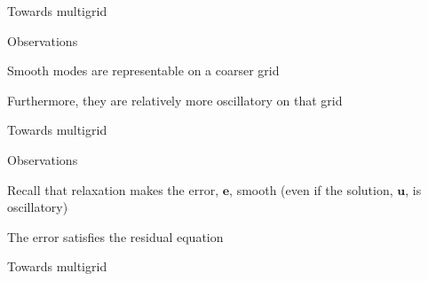 \documentclass[18pt,xcolor=table]{beamer}
\begin{document}
\begin{frame}{Towards multigrid}
\begin{block}{Observations}
\bit
\item Smooth modes are representable on a coarser grid
\item Furthermore, they are relatively more oscillatory on that grid 
\eit
\end{block}
\end{frame}

\begin{frame}{Towards multigrid}
\begin{block}{Observations}
\bit
\item Recall that relaxation makes the error, $\mathbf{e}$, smooth (even if the solution, $\mathbf{u}$, is oscillatory)
\item The error satisfies the residual equation
\item 
\eit
\end{block}
\end{frame}

\begin{frame}{Towards multigrid}
\begin{block}{}
\bit
\item
\eit
\end{block}
\end{frame}
\end{document}
